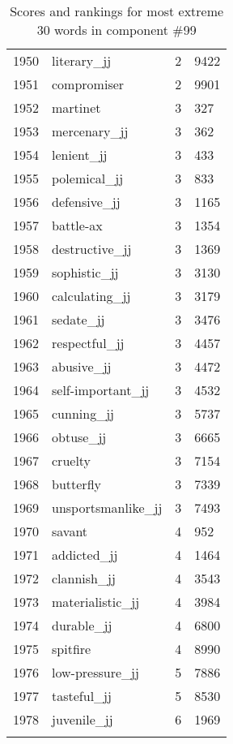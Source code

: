 \begin{longtable}[!htbp]{| rlr@{.}l |}
    1950 & literary\_jj & 2 & 9422 \\
    1951 & compromiser & 2 & 9901 \\
    1952 & martinet & 3 & 327 \\
    1953 & mercenary\_jj & 3 & 362 \\
    1954 & lenient\_jj & 3 & 433 \\
    1955 & polemical\_jj & 3 & 833 \\
    1956 & defensive\_jj & 3 & 1165 \\
    1957 & battle-ax & 3 & 1354 \\
    1958 & destructive\_jj & 3 & 1369 \\
    1959 & sophistic\_jj & 3 & 3130 \\
    1960 & calculating\_jj & 3 & 3179 \\
    1961 & sedate\_jj & 3 & 3476 \\
    1962 & respectful\_jj & 3 & 4457 \\
    1963 & abusive\_jj & 3 & 4472 \\
    1964 & self-important\_jj & 3 & 4532 \\
    1965 & cunning\_jj & 3 & 5737 \\
    1966 & obtuse\_jj & 3 & 6665 \\
    1967 & cruelty & 3 & 7154 \\
    1968 & butterfly & 3 & 7339 \\
    1969 & unsportsmanlike\_jj & 3 & 7493 \\
    1970 & savant & 4 & 952 \\
    1971 & addicted\_jj & 4 & 1464 \\
    1972 & clannish\_jj & 4 & 3543 \\
    1973 & materialistic\_jj & 4 & 3984 \\
    1974 & durable\_jj & 4 & 6800 \\
    1975 & spitfire & 4 & 8990 \\
    1976 & low-pressure\_jj & 5 & 7886 \\
    1977 & tasteful\_jj & 5 & 8530 \\
    1978 & juvenile\_jj & 6 & 1969 \\
    \hline
    \caption{Scores and rankings for most extreme 30 words in component \#99} \\
\end{longtable}
